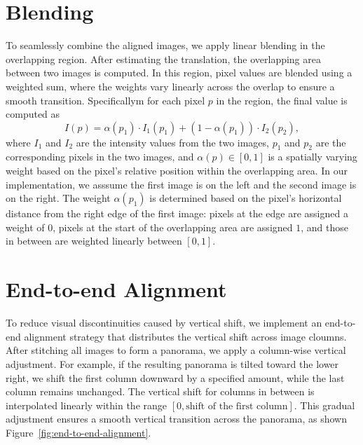 \section{Blending}

To seamlessly combine the aligned images, we apply linear blending in the 
overlapping region. After estimating the translation, the overlapping area between 
two images is computed. In this region, pixel values are blended using a weighted 
sum, where the weights vary linearly across the overlap to ensure a smooth 
transition. Specificallym for each pixel $p$ in the region, the final value is 
computed as 
$$
I(p) = \alpha(p_1) \cdot I_1(p_1) + (1 - \alpha(p_1)) \cdot I_2(p_2),
$$ 
where $I_1$ and $I_2$ are the intensity values from the two images, $p_1$ and $p_2$ 
are the corresponding pixels in the two images, and $\alpha(p) \in [0, 1]$ is a 
spatially varying weight based on the pixel's relative position within the 
overlapping area. In our implementation, we asssume the first image is on the left 
and the second image is on the right. The weight $\alpha(p_1)$ is determined based 
on the pixel's horizontal distance from the right edge of the first image: pixels 
at the edge are assigned a weight of $0$, pixels at the start of the overlapping 
area are assigned $1$, and those in between are weighted linearly between $[0, 1]$.

\section{End-to-end Alignment}

To reduce visual discontinuities caused by vertical shift, we implement an 
end-to-end alignment strategy that distributes the vertical shift across image 
cloumns. After stitching all images to form a panorama, we apply a column-wise  
vertical adjustment. For example, if the resulting panorama is tilted toward the 
lower right, we shift the first column downward by a specified amount, while the 
last column remains unchanged. The vertical shift for columns in between is 
interpolated linearly within the range $[0, \text{shift of the first column}]$. 
This gradual adjustment ensures a smooth vertical transition across the panorama, 
as shown Figure~\ref{fig:end-to-end-alignment}.

